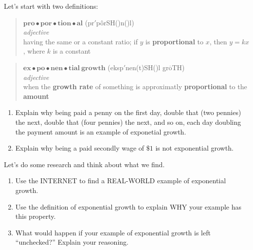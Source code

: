 \documentclass[nooutcomes,noauthor,hints]{ximera}
\begin{document}
\mynewpage



\begin{question}
  Let's start with two definitions:
  \begin{mdframed}[style=OutcomeStyle]
\begin{quote}
  $\textbf{pro}\bullet\textbf{por}\bullet\textbf{tion}\bullet\textbf{al}$
  (pr{}$'$p\^orSH({})n({})l)
  \\
  
  \textit{adjective}\\

  
\quad having the same or a constant ratio; if $y$ is \textbf{proportional} to
$x$, then $y = k x$, where $k$ is a constant
\end{quote}
  \end{mdframed}

  
  \begin{mdframed}[style=OutcomeStyle]
\begin{quote}
  $\textbf{ex}\bullet\textbf{po}\bullet\textbf{nen}\bullet\textbf{tial}~\textbf{growth}$
  ({}eksp{}$'$nen(t)SH({})l gr$\overline{\mbox{o}}$TH)
  \\
  
  \textit{adjective}\\

  
\quad when the \textbf{growth rate} of something is approximatly
\textbf{proportional} to the \textbf{amount}
\end{quote}
  \end{mdframed}
  \begin{enumerate}
  \item Explain why being paid a penny on the first day, double
    that (two pennies) the next, double that (four pennies) the next,
    and so on, each day doubling the payment amount is an example of
    exponetial growth.

  \item Explain why being a paid secondly wage of $\$1$ is not
    exponential growth.
\end{enumerate}


\end{question}
\mynewpage


\begin{question}
  Let's do some research and think about what we find.
  \begin{enumerate}
    \item Use the INTERNET to find a REAL-WORLD example of exponential growth. 
    \item Use the definition of exponential growth to explain WHY your example  has this property. 
    \item What would happen if your example of exponential growth is left ``unchecked?'' Explain your reasoning. 
  \end{enumerate}


\end{question}
\end{document}
